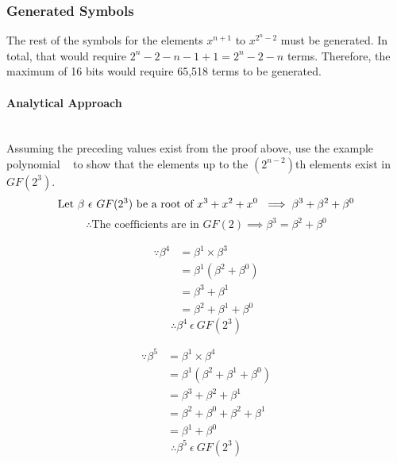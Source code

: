     \subsubsection{Generated Symbols} The rest of the symbols for the elements
    $x^{n+1}$ to $x^{2^{n}-2}$ must be generated. In total, that would require
    $2^{n}-2-n-1+1=2^{n}-2-n$ terms. Therefore, the maximum of 16 bits would
    require 65,518 terms to be generated.

        \paragraph{Analytical Approach} \leavevmode \\ Assuming the preceding
        values exist from the proof above, use the example polynomial
        \examplepoly~ to show that the elements up to the $(2^{n-2})$th
        elements exist in $GF(2^{3})$.
        \[ \text{Let }\beta \ \epsilon \ GF(2^{3}) \text{ be a root of
        $x^{3}+x^{2}+x^{0}$~} \implies \beta^{3} + \beta^{2} + \beta^{0} \]
        \[ \therefore \text{The coefficients are in } GF(2) \implies \beta^{3}
        = \beta^{2} + \beta^{0} \]
        \begin{minipage}[t]{0.5\textwidth}
            \begin{equation*}
                \begin{split}
                    \because \beta^{4} & = \beta^{1} \times \beta^{3} \\
                    & = \beta^{1} (\beta^{2}+\beta^{0}) \\
                    & = \beta^{3}+\beta^{1} \\
                    & = \beta^{2}+\beta^{1}+\beta^{0}
                \end{split}
            \end{equation*}
            \[ \therefore \beta^{4} \ \epsilon \ GF(2^{3}) \]
        \end{minipage}
        \begin{minipage}[t]{0.5\textwidth}
            \begin{equation*}
                \begin{split}
                    \because \beta^{5} & = \beta^{1} \times \beta^{4} \\
                    & = \beta^{1} (\beta^{2}+\beta^{1}+\beta^{0}) \\
                    & = \beta^{3}+\beta^{2}+\beta^{1} \\
                    & = \beta^{2}+\beta^{0}+\beta^{2}+\beta^{1} \\
                    & = \beta^{1}+\beta^{0}
                \end{split}
            \end{equation*}
            \[ \therefore \beta^{5} \ \epsilon \ GF(2^{3}) \]
        \end{minipage}


